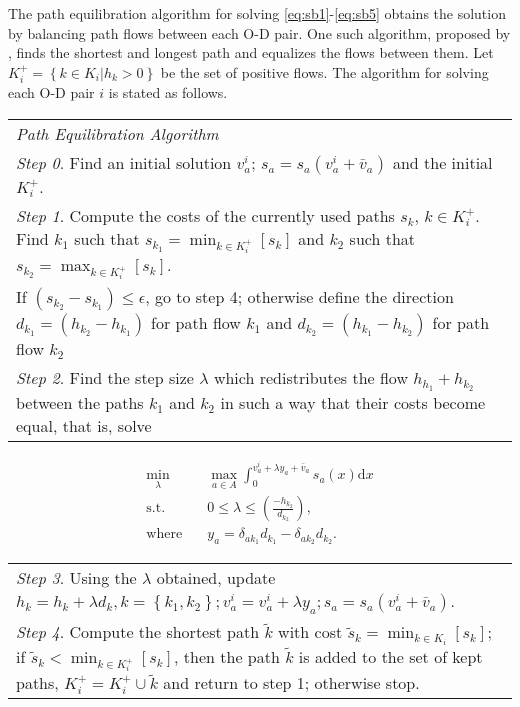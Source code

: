 The path equilibration algorithm for solving \ref{eq:sb1}-\ref{eq:sb5} 
obtains the solution by balancing path flows between each O-D pair.
One such algorithm, proposed by \cite{Dafermos}, 
finds the shortest and longest path and equalizes the flows between them.
Let $K_i^{+} = \left\{ k \in K_i | h_k > 0 \right\}$ be the set of positive flows.
The algorithm for solving each O-D pair $i$ is stated as follows.
\begin{table}[H]
    \begin{tabular}{ m{} }
        \hspace{-.5cm}\emph{Path Equilibration Algorithm} \\
        \emph{Step 0}. Find an initial solution $v_a^i$; $s_a = s_a(v_a^i+\bar{v}_a)$ and the initial $K_i^+$.\\
        \emph{Step 1}. Compute the costs of the currently used paths $s_k$, $k \in K_i^+$. Find $k_1$ such that $s_{k_1} = \displaystyle \min_{k \in K_i^+} \left[ s_k \right]$ and $k_2$ such that $s_{k_2} = \displaystyle \max_{k \in K_i^+} \left[s_k \right]$.\\
        If $(s_{k_2} - s_{k_1}) \leq \epsilon$, go to step 4;
        otherwise define the direction $d_{k_1} = (h_{k_2} - h_{k_1})$ for path flow $k_1$ and $d_{k_2} = (h_{k_1} - h_{k_2})$ for path flow $k_2$\\
        \emph{Step 2}. Find the step size $\lambda$ which redistributes the flow $h_{h_1} + h_{k_2}$ between the paths $k_1$ and $k_2$ in such a way that their costs become equal, that is, solve
    \end{tabular}
\end{table}
\vspace{-3em}
\begin{align}
    \min_\lambda & \quad \max_{a \in A} \int_0^{v_a^i + \lambda y_a + \bar{v}_a} s_a(x) \mathrm{d}x \\
    \text{s.t.} & \quad 0 \leq \lambda \leq \left( \frac{-h_{k_2}}{d_{k_2}} \right), \\
    \text{where} & \quad y_a = \delta_{ak_1} d_{k_1} - \delta_{ak_2} d_{k_2}.
\end{align}
\vspace{-2em}
\begin{table}[H]
    \begin{tabular}{ m{} }
        \emph{Step 3}. Using the $\lambda$ obtained, update $h_k = h_k + \lambda d_k, k = \left\{ k_1, k_2 \right\}; v_a^i = v_a^i + \lambda y_a; s_a = s_a(v_a^i + \bar{v}_a)$. \\
        \emph{Step 4}. Compute the shortest path $\tilde{k}$ with cost $\tilde{s}_k = \displaystyle \min_{k \in K_i} \left[ s_k \right]$;
        if $\tilde{s}_k < \displaystyle \min_{k \in K_i^+} \left[ s_k \right]$, then the path $\tilde{k}$ is added to the set of kept paths, $K_i^+ = K_i^+ \cup \tilde{k}$ and return to step 1; otherwise stop.
    \end{tabular}
\end{table}

